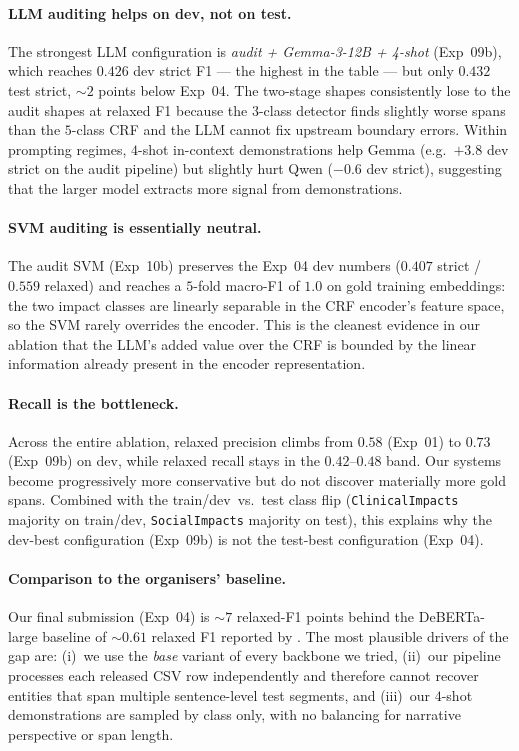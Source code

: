 \documentclass[11pt]{article}
\begin{document}
\paragraph{LLM auditing helps on dev, not on test.} The strongest
LLM configuration is \emph{audit + Gemma-3-12B + 4-shot} (Exp~09b),
which reaches $0.426$ dev strict F1 --- the highest in the table ---
but only $0.432$ test strict, $\sim$$2$ points below Exp~04. The
two-stage shapes consistently lose to the audit shapes at relaxed
F1 because the $3$-class detector finds slightly worse spans than
the $5$-class CRF and the LLM cannot fix upstream boundary errors.
Within prompting regimes, $4$-shot in-context demonstrations help
Gemma (e.g.\ $+3.8$ dev strict on the audit pipeline) but slightly
hurt Qwen ($-0.6$ dev strict), suggesting that the larger model
extracts more signal from demonstrations.

\paragraph{SVM auditing is essentially neutral.} The audit SVM
(Exp~10b) preserves the Exp~04 dev numbers ($0.407$ strict /
$0.559$ relaxed) and reaches a $5$-fold macro-F1 of $1.0$ on gold
training embeddings: the two impact classes are linearly separable
in the CRF encoder's feature space, so the SVM rarely overrides
the encoder. This is the cleanest evidence in our ablation that
the LLM's added value over the CRF is bounded by the linear
information already present in the encoder representation.

\paragraph{Recall is the bottleneck.} Across the entire ablation,
relaxed precision climbs from $0.58$ (Exp~01) to $0.73$ (Exp~09b)
on dev, while relaxed recall stays in the $0.42$--$0.48$ band. Our
systems become progressively more conservative but do not discover
materially more gold spans. Combined with the train/dev~vs.~test
class flip (\texttt{ClinicalImpacts} majority on train/dev,
\texttt{SocialImpacts} majority on test), this explains why the
dev-best configuration (Exp~09b) is not the test-best
configuration (Exp~04).

\paragraph{Comparison to the organisers' baseline.} Our final
submission (Exp~04) is $\sim$$7$ relaxed-F1 points behind the
DeBERTa-large baseline of $\sim$$0.61$ relaxed F1 reported by
\citet{dey2025inference}. The most plausible drivers of the gap
are: (i)~we use the \emph{base} variant of every backbone we tried,
(ii)~our pipeline processes each released CSV row independently and
therefore cannot recover entities that span multiple sentence-level
test segments, and (iii)~our $4$-shot demonstrations are sampled by
class only, with no balancing for narrative perspective or span
length.
\end{document}
